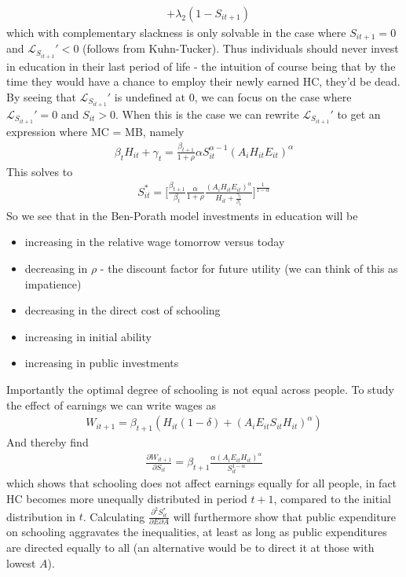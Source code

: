 \documentclass[12pt, a4paper]{article}
\begin{document}
\begin{multicols}{2}
\begin{align*}
&+\lambda_2(1- S_{it+1})
\end{align*}
which with complementary slackness is only solvable in the case where $S_{it+1}=0$ and $\mathcal{L}_{S_{it+1}}'<0$ (follows from Kuhn-Tucker). Thus individuals should never invest in education in their last period of life - the intuition of course being that by the time they would have a chance to employ their newly earned HC, they'd be dead. By seeing that $\mathcal{L}_{S_{it+1}}'$ is undefined at 0, we can focus on the case where $\mathcal{L}_{S_{it+1}}'=0$ and $S_{it}>0$. When this is the case we can rewrite $\mathcal{L}_{S_{it+1}}'$ to get an expression where MC = MB, namely
\begin{align*}
 \beta_t H_{it} + \gamma_t = \frac{\beta_{t+1}}{1+ \rho} \alpha S_{it}^{\alpha-1}(A_iH_{it}E_{it})^{\alpha}
\end{align*}
This solves to
\begin{align*}
S_{it}^* = \bigg[ \frac{\beta_{t+1}}{\beta_t}\frac{\alpha}{1+\rho}\frac{(A_iH_{it}E_{it})^{\alpha}}{H_{it}+ \frac{\gamma_t}{\beta_t}} \bigg]^{\frac{1}{1-\alpha}}
\end{align*}
So we see that in the Ben-Porath model investments in education will be
\begin{itemize}
\item increasing in the relative wage tomorrow versus today
\item decreasing in $\rho$ - the discount factor for future utility (we can think of this as impatience)
\item decreasing in the direct cost of schooling
\item increasing in initial ability
\item increasing in public investments
\end{itemize}
Importantly the optimal degree of schooling is not equal across people. To study the effect of earnings we can write wages as
\begin{align*}
W_{it+1} = \beta_{t+1}(H_{it}(1-\delta)
+ (A_i E_{it} S_{it} H_{it})^{\alpha})
\end{align*}
And thereby find
\begin{align*}
\frac{\partial W_{it+1} }{\partial S_{it}} = \beta_{t+1} \frac{\alpha(A_i E_{it} H_{it})^{\alpha}}{S_{it}^{1- \alpha}}
\end{align*}
which shows that schooling does not affect earnings equally for all people, in fact HC becomes more unequally distributed in period $t+1$, compared to the initial distribution in $t$. Calculating $\frac{\partial^2 S_{it}^* }{\partial E \partial A}$ will furthermore show that public expenditure on schooling aggravates the inequalities, at least as long as public expenditures are directed equally to all (an alternative would be to direct it at those with lowest $A$).


\end{multicols}
\end{document}
